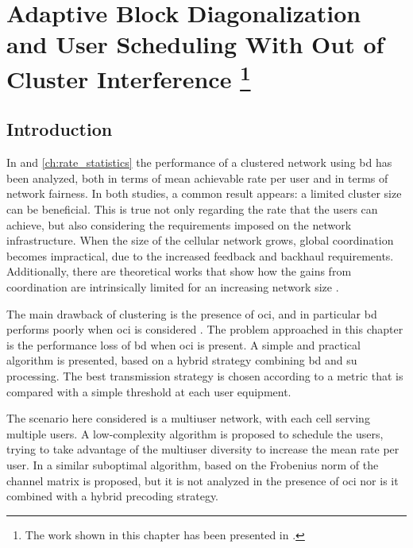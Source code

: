 \chapter[Adaptive User Scheduling]{Adaptive Block Diagonalization and User
Scheduling With Out of Cluster Interference \footnote{The work shown in this
chapter has been presented in \cite{jjgarcia14}.}}\label{ch:adaptive_schedule}

\section{Introduction}\label{sec:sched_intro}

In  and \ref{ch:rate_statistics} the performance of a
clustered network using \gls{bd} has been analyzed, both in terms of mean
achievable rate per user and in terms of network fairness. In both studies, a
common result appears: a limited cluster size can be beneficial. This is true
not only regarding the rate that the users can achieve, but also considering
the requirements imposed on the network infrastructure. When the size of the
cellular network grows, global coordination becomes impractical, due to the
increased feedback and backhaul requirements. Additionally, there are
theoretical works that show how the gains from coordination are intrinsically
limited for an increasing network size \cite{lozano13}.

The main drawback of clustering is the presence of \gls{oci}, and in particular
\gls{bd} performs poorly when \gls{oci} is considered \cite{shim08}. The problem
approached in this chapter is the performance loss of \gls{bd} when \gls{oci} is
present. A simple and practical algorithm is presented, based on a hybrid
strategy combining \gls{bd} and \gls{su} processing. The best transmission
strategy is chosen according to a metric that is compared with a simple
threshold at each user equipment.

The scenario here considered is a multiuser network, with each cell serving
multiple users. A low-complexity algorithm is proposed to schedule the users,
trying to take advantage of the multiuser diversity to increase the mean rate
per user. In \cite{shen06} a similar suboptimal algorithm, based on the
Frobenius norm of the channel matrix is proposed, but it is not analyzed in the
presence of \gls{oci} nor is it combined with a hybrid precoding strategy.

